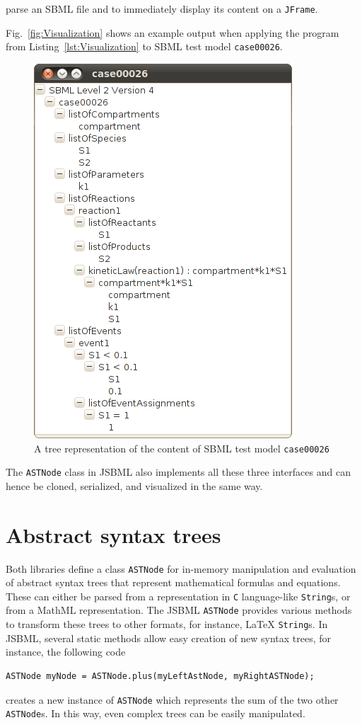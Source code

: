 \documentclass[
  letterpaper,
  11pt,
  headsepline,
  pointlessnumbers,
  tablecaptionabove,
  headinclude,
  appendixprefix,
  idxtotoc,
  bibtotoc,
  titlepage
]{scrartcl}
\begin{document}
parse an SBML file and to immediately display its content on a \verb!JFrame!.

Fig.~\vref{fig:Visualization} shows an example output when applying the program
from Listing~\vref{lst:Visualization} to SBML test model \texttt{case00026}.
\begin{figure}
\includegraphics[width=.35\textwidth]{posters/2010_ICSB_and_COMBINE/JSBMLvisualizerTransparent}
\caption[Tree representation of an SBML file]{A tree representation of the
content of SBML test model \texttt{case00026}}
\label{fig:Visualization}
\end{figure}
The \verb!ASTNode! class in JSBML also implements all these three interfaces and
can hence be cloned, serialized, and visualized in the same way.


\section{Abstract syntax trees}

Both libraries define a class \verb!ASTNode! for in-memory manipulation and
evaluation of abstract syntax trees that represent mathematical formulas and
equations. These can either be parsed from a representation in \verb!C!
language-like \verb!String!s, or from a MathML representation. The JSBML
\verb!ASTNode! provides various methods to transform these trees to other
formats, for instance, \LaTeX{} \verb!String!s. In JSBML, several static methods
allow easy creation of new syntax trees, for instance, the following code
\begin{verbatim}
ASTNode myNode = ASTNode.plus(myLeftAstNode, myRightASTNode);
\end{verbatim}
creates a new instance of \verb!ASTNode! which represents the sum of the two
other \verb!ASTNode!s. In this way, even complex trees can be easily
manipulated.
\end{document}
